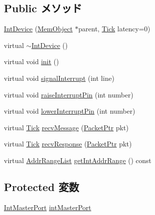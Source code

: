 \subsection*{Public メソッド}
\begin{DoxyCompactItemize}
\item 
\hyperlink{classX86ISA_1_1IntDevice_a860c06bf1cff1018280578ab96cdc37c}{IntDevice} (\hyperlink{classMemObject}{MemObject} $\ast$parent, \hyperlink{base_2types_8hh_a5c8ed81b7d238c9083e1037ba6d61643}{Tick} latency=0)
\item 
virtual \hyperlink{classX86ISA_1_1IntDevice_aa3d5db8cb913cc5f6e45e40f0d6b6f72}{$\sim$IntDevice} ()
\item 
virtual void \hyperlink{classX86ISA_1_1IntDevice_a02fd73d861ef2e4aabb38c0c9ff82947}{init} ()
\item 
virtual void \hyperlink{classX86ISA_1_1IntDevice_a10c7e7cffe2e50c6c515fa1d8f0a4460}{signalInterrupt} (int line)
\item 
virtual void \hyperlink{classX86ISA_1_1IntDevice_a4bafbbd02159d7bdc6eae7f4197db84f}{raiseInterruptPin} (int number)
\item 
virtual void \hyperlink{classX86ISA_1_1IntDevice_a1909001c0927e6a93d8bebf9d30bc11c}{lowerInterruptPin} (int number)
\item 
virtual \hyperlink{base_2types_8hh_a5c8ed81b7d238c9083e1037ba6d61643}{Tick} \hyperlink{classX86ISA_1_1IntDevice_a6da97a03af9e80f6f8b865b85a430f35}{recvMessage} (\hyperlink{classPacket}{PacketPtr} pkt)
\item 
virtual \hyperlink{base_2types_8hh_a5c8ed81b7d238c9083e1037ba6d61643}{Tick} \hyperlink{classX86ISA_1_1IntDevice_ae473b2a0c55e73359b9643810869ca81}{recvResponse} (\hyperlink{classPacket}{PacketPtr} pkt)
\item 
virtual \hyperlink{classstd_1_1list}{AddrRangeList} \hyperlink{classX86ISA_1_1IntDevice_ac142ed8f5e7f1e45022f45d316e131a3}{getIntAddrRange} () const 
\end{DoxyCompactItemize}
\subsection*{Protected 変数}
\begin{DoxyCompactItemize}
\item 
\hyperlink{classX86ISA_1_1IntDevice_1_1IntMasterPort}{IntMasterPort} \hyperlink{classX86ISA_1_1IntDevice_a874cd4b6512ae9527310c851890114f5}{intMasterPort}
\end{DoxyCompactItemize}


